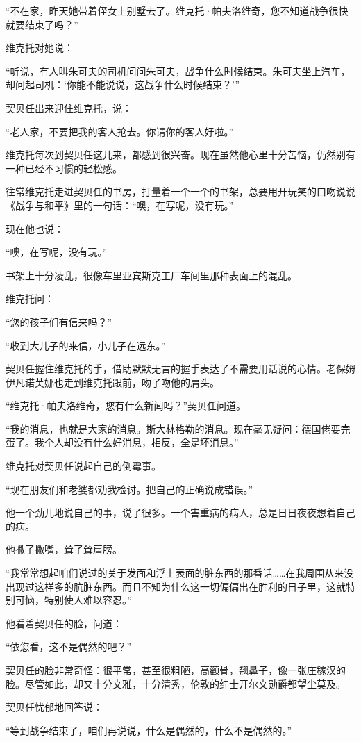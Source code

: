 “不在家，昨天她带着侄女上别墅去了。维克托·帕夫洛维奇，您不知道战争很快就要结束了吗？”

维克托对她说：

“听说，有人叫朱可夫的司机问问朱可夫，战争什么时候结束。朱可夫坐上汽车，却问起司机：‘你能不能说说，这战争什么时候结束？’”

契贝任出来迎住维克托，说：

“老人家，不要把我的客人抢去。你请你的客人好啦。”

维克托每次到契贝任这儿来，都感到很兴奋。现在虽然他心里十分苦恼，仍然别有一种已经不习惯的轻松感。

往常维克托走进契贝任的书房，打量着一个一个的书架，总要用开玩笑的口吻说说《战争与和平》里的一句话：“噢，在写呢，没有玩。”

现在他也说：

“噢，在写呢，没有玩。”

书架上十分凌乱，很像车里亚宾斯克工厂车间里那种表面上的混乱。

维克托问：

“您的孩子们有信来吗？”

“收到大儿子的来信，小儿子在远东。”

契贝任握住维克托的手，借助默默无言的握手表达了不需要用话说的心情。老保姆伊凡诺芙娜也走到维克托跟前，吻了吻他的肩头。

“维克托·帕夫洛维奇，您有什么新闻吗？”契贝任问道。

“我的消息，也就是大家的消息。斯大林格勒的消息。现在毫无疑问：德国佬要完蛋了。我个人却没有什么好消息，相反，全是坏消息。”

维克托对契贝任说起自己的倒霉事。

“现在朋友们和老婆都劝我检讨。把自己的正确说成错误。”

他一个劲儿地说自己的事，说了很多。一个害重病的病人，总是日日夜夜想着自己的病。

他撇了撇嘴，耸了耸肩膀。

“我常常想起咱们说过的关于发面和浮上表面的脏东西的那番话……在我周围从来没出现过这样多的肮脏东西。而且不知为什么这一切偏偏出在胜利的日子里，这就特别可恼，特别使人难以容忍。”

他看着契贝任的脸，问道：

“依您看，这不是偶然的吧？”

契贝任的脸非常奇怪：很平常，甚至很粗陋，高颧骨，翘鼻子，像一张庄稼汉的脸。尽管如此，却又十分文雅，十分清秀，伦敦的绅士开尔文勋爵都望尘莫及。

契贝任忧郁地回答说：

“等到战争结束了，咱们再说说，什么是偶然的，什么不是偶然的。”

